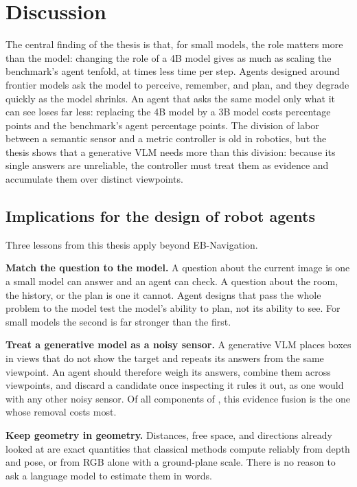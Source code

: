 \section{Discussion}
The central finding of the thesis is that, for small models, the role matters more than the model: changing the role
of a 4B model gives as much as scaling the benchmark's agent tenfold, at \nSpeedUp{} times less time per step. Agents designed
around frontier models ask the model to perceive, remember, and plan, and they degrade quickly as the model shrinks.
An agent that asks the same model only what it can see loses far less: replacing the 4B model by a 3B model costs
\ours \nScaleDrop{} percentage points and the benchmark's agent \nScaleDropEB{} percentage points. The division of labor between a
semantic sensor and a metric controller is old in robotics, but the thesis shows that a generative VLM needs more
than this division: because its single answers are unreliable, the controller must treat them as evidence and
accumulate them over distinct viewpoints.

\subsection{Implications for the design of robot agents}
Three lessons from this thesis apply beyond EB-Navigation.

\noindent\textbf{Match the question to the model.} A question about the current image is one a small model can
answer and an agent can check. A question about the room, the history, or the plan is one it cannot. Agent designs
that pass the whole problem to the model test the model's ability to plan, not its ability to see. For small models
the second is far stronger than the first.

\noindent\textbf{Treat a generative model as a noisy sensor.} A generative VLM places boxes in views that do not
show the target and repeats its answers from the same viewpoint. An agent should therefore weigh its answers, combine
them across viewpoints, and discard a candidate once inspecting it rules it out, as one would with any other noisy
sensor. Of all components of \ours, this evidence fusion is the one whose removal costs most.

\noindent\textbf{Keep geometry in geometry.} Distances, free space, and directions already looked at are exact
quantities that classical methods compute reliably from depth and pose, or from RGB alone with a ground-plane scale.
There is no reason to ask a language model to estimate them in words.

